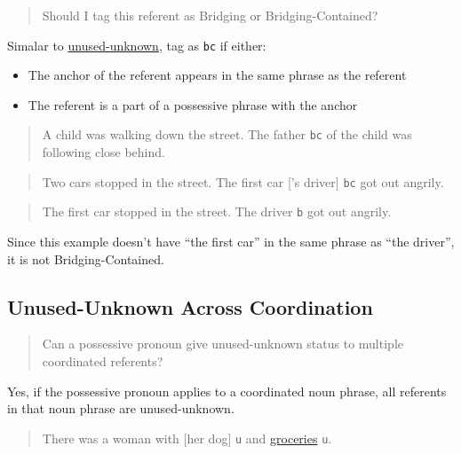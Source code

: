 \documentclass[
]{book}
\providecommand{\tightlist}{%
  \setlength{\itemsep}{0pt}\setlength{\parskip}{0pt}}
\begin{document}
\begin{quote}
Should I tag this referent as Bridging or Bridging-Contained?
\end{quote}

Simalar to \protect\hyperlink{new-vs.-unused-unknown}{unused-unknown}, tag as \texttt{bc} if either:

\begin{itemize}
\tightlist
\item
  The anchor of the referent appears in the same phrase as the referent
\item
  The referent is a part of a possessive phrase with the anchor
\end{itemize}

\begin{quote}
A child was walking down the street.
The father \texttt{bc} of the child was following close behind.
\end{quote}

\begin{quote}
Two cars stopped in the street.
The first car {[}'s driver{]} \texttt{bc} got out angrily.
\end{quote}

\begin{quote}
The first car stopped in the street.
The driver \texttt{b} got out angrily.
\end{quote}

Since this example doesn't have ``the first car'' in the same phrase as ``the driver'', it is not Bridging-Contained.

\hypertarget{unused-unknown-across-coordination}{%
\subsection{Unused-Unknown Across Coordination}\label{unused-unknown-across-coordination}}

\begin{quote}
Can a possessive pronoun give unused-unknown status to multiple coordinated referents?
\end{quote}

Yes, if the possessive pronoun applies to a coordinated noun phrase, all referents in that noun phrase are unused-unknown.

\begin{quote}
There was a woman with {[}her dog{]} \texttt{u} and \protect\hyperlink{groceries}{groceries} \texttt{u}.
\end{quote}
\end{document}
